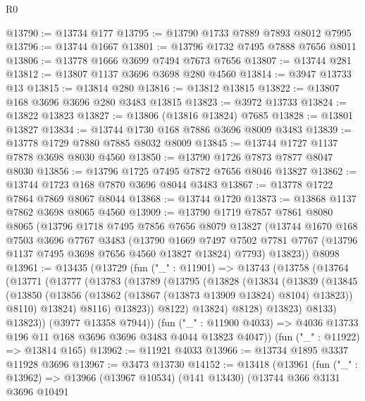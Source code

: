 \begin{lexlean}{R0}
\begin{coremodule}
@13790 := @13734 @177
@13795 := @13790 @1733 @7889 @7893 @8012 @7995
@13796 := @13744 @1667
@13801 := @13796 @1732 @7495 @7888 @7656 @8011
@13806 := @13778 @1666 @3699 @7494 @7673 @7656
@13807 := @13744 @281
@13812 := @13807 @1137 @3696 @3698 @280 @4560
@13814 := @3947 @13733 @13
@13815 := @13814 @280
@13816 := @13812 @13815
@13822 := @13807 @168 @3696 @3696 @280 @3483 @13815
@13823 := @3972 @13733
@13824 := @13822 @13823
@13827 := @13806 (@13816 @13824) @7685
@13828 := @13801 @13827
@13834 := @13744 @1730 @168 @7886 @3696 @8009 @3483
@13839 := @13778 @1729 @7880 @7885 @8032 @8009
@13845 := @13744 @1727 @1137 @7878 @3698 @8030 @4560
@13850 := @13790 @1726 @7873 @7877 @8047 @8030
@13856 := @13796 @1725 @7495 @7872 @7656 @8046 @13827
@13862 := @13744 @1723 @168 @7870 @3696 @8044 @3483
@13867 := @13778 @1722 @7864 @7869 @8067 @8044
@13868 := @13744 @1720
@13873 := @13868 @1137 @7862 @3698 @8065 @4560
@13909 := @13790
    @1719
    @7857
    @7861
    @8080
    @8065
    (@13796
      @1718
      @7495
      @7856
      @7656
      @8079
      @13827
      (@13744
        @1670
        @168
        @7503
        @3696
        @7767
        @3483
        (@13790
          @1669
          @7497
          @7502
          @7781
          @7767
          (@13796 @1137 @7495 @3698 @7656 @4560 @13827 @13824)
          @7793)
        @13823))
    @8098
@13961 := @13435
    (@13729
      (fun ("_" : @11901) =>
      @13743
        (@13758
          (@13764
            (@13771
              (@13777
                (@13783
                  (@13789
                    (@13795
                      (@13828
                        (@13834
                          (@13839
                            (@13845
                              (@13850
                                (@13856 (@13862 (@13867 (@13873 @13909 @13824) @8104) @13823))
                                @8110)
                              @13824)
                            @8116)
                          @13823))
                      @8122)
                    @13824)
                  @8128)
                @13823)
              @8133)
            @13823))
        (@3977 @13358 @7944))
      (fun ("_" : @11900 @4033) => @4036 @13733 @196 @11 @168 @3696 @3696 @3483 @4044 @13823 @4047))
    (fun ("_" : @11922) => @13814 @165)
@13962 := @11921 @4033
@13966 := @13734 @1895 @3337 @11928 @3696
@13967 := @3473 @13730
@14152 := @13418
    (@13961
      (fun ("_" : @13962) =>
      @13966
        (@13967 @10534)
        (@141 @13430)
        (@13744
          @366
          @3131
          @3696
          @10491

\end{coremodule}
\end{lexlean}
